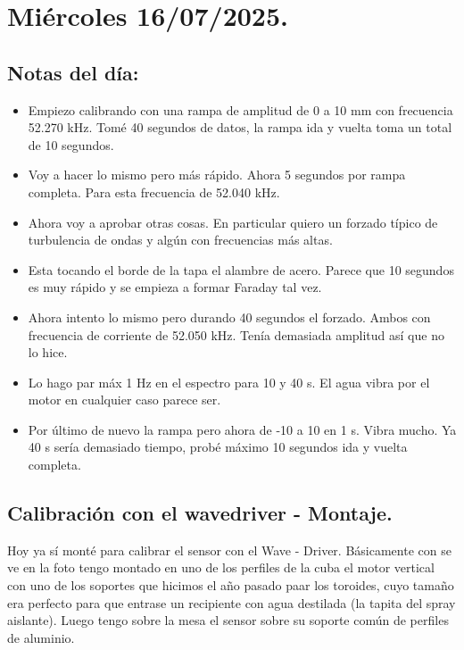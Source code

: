 \section{Miércoles 16/07/2025.}
\subsection*{Notas del día:}
\begin{itemize}
	\item Empiezo calibrando con una rampa de amplitud de 0 a 10 mm con frecuencia 52.270 kHz. Tomé 40 segundos de datos, la rampa ida y vuelta toma un total de 10 segundos. 
	\item Voy a hacer lo mismo pero más rápido. Ahora 5 segundos por rampa completa. Para esta frecuencia de 52.040 kHz. 
	
	\item Ahora voy a aprobar otras cosas. En particular quiero un forzado típico de turbulencia de ondas y algún con frecuencias más altas. 
	\item Esta tocando el borde de la tapa el alambre de acero. Parece que 10 segundos es muy rápido y se empieza a formar Faraday tal vez. 
	\item Ahora intento lo mismo pero durando 40 segundos el forzado. Ambos con frecuencia de corriente de 52.050 kHz. Tenía demasiada amplitud así que no lo hice. 
	
	\item Lo hago par máx 1 Hz en el espectro para 10 y 40 s. El agua vibra por el motor en cualquier caso parece ser. 
	
	\item Por último de nuevo la rampa pero ahora de -10 a 10 en 1 s. Vibra mucho. Ya 40 s sería demasiado tiempo, probé máximo 10 segundos ida y vuelta completa. 
\end{itemize} 

\subsection*{Calibración con el wavedriver - Montaje.} 
Hoy ya sí monté para calibrar el sensor con el Wave - Driver. Básicamente con se ve en la foto tengo montado en uno de los perfiles de la cuba el motor vertical con uno de los soportes que hicimos el año pasado paar los toroides, cuyo tamaño era perfecto para que entrase un recipiente con agua destilada (la tapita del spray aislante). Luego tengo sobre la mesa el sensor sobre su soporte común de perfiles de aluminio. 


